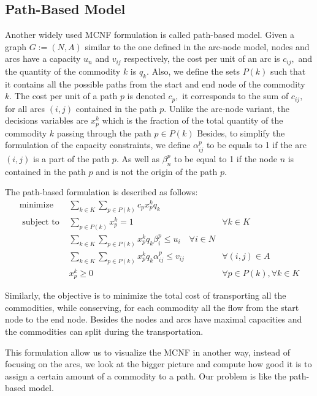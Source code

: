\subsection{Path-Based Model}
Another widely used MCNF formulation is called path-based model. Given a graph $G:=(N, A)$ similar to the one defined in the arc-node model, nodes and arcs have a capacity $u_{n}$ and $v_{i j}$ respectively, the cost per unit of an arc is $c_{i j},$ and the quantity of the commodity $k$ is $q_{k} .$ Also, we define the sets $P(k)$ such that it contains all the possible paths from the start and end node of the commodity $k .$ The cost per unit of a path $p$ is denoted $c_{p},$ it corresponds to the sum of $c_{i j},$ for all arcs $(i, j)$ contained in the path $p .$ Unlike the arc-node variant, the decisions variables are $x_{p}^{k}$ which is the fraction of the total quantity of the commodity $k$ passing through the path $p \in P(k)$ Besides, to simplify the formulation of the capacity constraints, we define $\alpha_{i j}^{p}$ to be equals to 1 if the arc $(i, j)$ is a part of the path $p .$ As well as $\beta_{n}^{p}$ to be equal to 1 if the node $n$ is contained in the path $p$ and is not the origin of the path $p$.

The path-based formulation is described as follows:
\begin{equation}\label{pathbasedmodel}\begin{array}{lll}
\operatorname{minimize} & \sum_{k \in K} \sum_{p \in P(k)} c_{p} x_{p}^{k} q_{k} \\
\text { subject to } & \sum_{p \in P(k)} x_{p}^{k}=1 & \forall k \in K \\
& \sum_{k \in K} \sum_{p \in P(k)} x_{p}^{k} q_{k} \beta_{i}^{p} \leq u_{i} \quad \forall i \in N \\
& \sum_{k \in K} \sum_{p \in P(k)} x_{p}^{k} q_{k} \alpha_{i j}^{p} \leq v_{i j} & \forall(i, j) \in A \\
& x_{p}^{k} \geq 0 & \forall p \in P(k), \forall k \in K
\end{array}\end{equation}

Similarly, the objective is to minimize the total cost of transporting all the commodities, while conserving, for each commodity all the flow from the start node
to the end node. Besides the nodes and arcs have maximal capacities and the commodities can split during the transportation.

This formulation allow us to visualize the MCNF in another way, instead of focusing
on the arcs, we look at the bigger picture and compute how good it is to
assign a certain amount of a commodity to a path. Our problem is like the path-based model.

